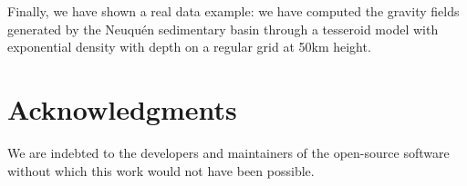 \documentclass[extra]{gji}
\begin{document}

Finally, we have shown a real data example: we have computed the gravity 
fields generated by the Neuqu\'en sedimentary basin through a tesseroid model 
with exponential density with depth on a regular grid at 50km height.



\section{Acknowledgments}

We are indebted to the developers and maintainers of the open-source
software without which this work would not have been possible.




\end{document}

